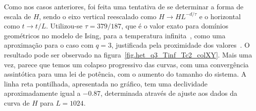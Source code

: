 Como nos casos anteriores, foi feita uma tentativa de se determinar a forma de escala de $H$, sendo o eixo vertical reescalado como $H \rightarrow HL^{-d/\tau}$ e o horizontal como $t \rightarrow t/L$. Utilizou-se $\tau = 379/187$, que é o valor exato para domínios geométricos no modelo de Ising, para a temperatura infinita~\cite{PRLJeferson,PREJeferson}, como uma aproximação para o caso com $q=3$, justificada pela proximidade dos valores~\cite{LoureiroPRE}. O resultado pode ser observado na figura~\ref{fig.het_q3_Tinf_Tc2_colXY}. Mais uma vez, parece que temos um colapso progressivo das curvas, com uma convergência assintótica para uma lei de potência, com o aumento do tamanho do sistema. A linha reta pontilhada, apresentada no gráfico, tem uma declividade aproximadamente igual a $-0.87$, determinada através de ajuste aos dados da curva de $H$ para $L=1024$.

